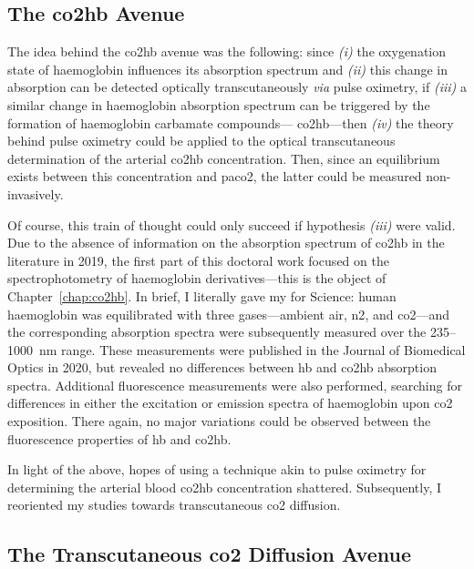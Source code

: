 \subsection{The \texorpdfstring{\gls{co2hb}}{Carbamino-Haemoglobin (CO2Hb)} Avenue}

The idea behind the \gls{co2hb} avenue was the following: since \textit{(i)} the oxygenation state of haemoglobin influences its absorption spectrum\cite{prahl1998} and \textit{(ii)} this change in absorption can be detected optically transcutaneously \textit{via} pulse oximetry\cite{nitzan2014, jubran2015}, if \textit{(iii)} a similar change in haemoglobin absorption spectrum can be triggered by the formation of haemoglobin carbamate compounds---\ie{} \gls{co2hb}---then \textit{(iv)} the theory behind pulse oximetry could be applied to the optical transcutaneous determination of the arterial \gls{co2hb} concentration. Then, since an equilibrium exists between this concentration and \gls{paco2}\cite{geers2000}, the latter could be measured non-invasively.

Of course, this train of thought could only succeed if hypothesis \textit{(iii)} were valid. Due to the absence of information on the absorption spectrum of \gls{co2hb} in the literature in 2019, the first part of this doctoral work focused on the spectrophotometry of haemoglobin derivatives---this is the object of Chapter~\ref{chap:co2hb}. In brief, I literally gave my \myblood{} for Science: human haemoglobin was equilibrated with three gases---ambient air, \gls{n2}, and \gls{co2}---and the corresponding absorption spectra were subsequently measured over the 235--1000~nm range. These measurements were published in the Journal of Biomedical Optics in 2020\cite{dervieux2020}, but revealed no differences between \gls{hb} and \gls{co2hb} absorption spectra. Additional fluorescence measurements were also performed, searching for differences in either the excitation or emission spectra of haemoglobin upon \gls{co2} exposition. There again, no major variations could be observed between the fluorescence properties of \gls{hb} and \gls{co2hb}. 

In light of the above, hopes of using a technique akin to pulse oximetry for determining the arterial blood \gls{co2hb} concentration shattered. Subsequently, I reoriented my studies towards transcutaneous \gls{co2} diffusion.

\subsection{The Transcutaneous \texorpdfstring{\gls{co2}}{CO2} Diffusion Avenue}

